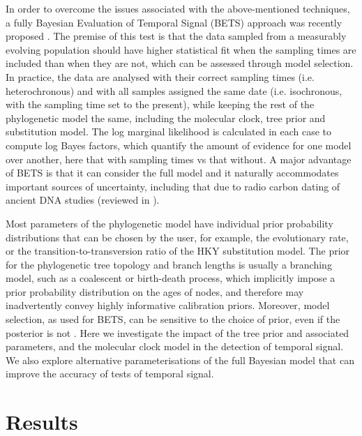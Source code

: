 \documentclass[10pt,letterpaper]{article}
\begin{document}
In order to overcome the issues associated with the above-mentioned techniques, a fully Bayesian Evaluation of Temporal Signal (BETS) approach was recently proposed \cite{duchene2020bayesian}. The premise of this test is that the data sampled from a measurably evolving population should have higher statistical fit when the sampling times are included than when they are not, which can be assessed through model selection. In practice, the data are analysed with their correct sampling times (i.e. heterochronous) and with all samples assigned the same date (i.e. isochronous, with the sampling time set to the present), while keeping the rest of the phylogenetic model the same, including the molecular clock, tree prior and substitution model. The log marginal likelihood is calculated in each case to compute log Bayes factors, which quantify the amount of evidence for one model over another, here that with sampling times vs that without. A major advantage of BETS is that it can consider the full model and it naturally accommodates important sources of uncertainty, including that due to radio carbon dating of ancient DNA studies \cite{molak2015empirical} (reviewed in \cite{spyrou2019ancient, duchene2020recovery}). 

Most parameters of the phylogenetic model have individual prior probability distributions that can be chosen by the user, for example, the evolutionary rate, or the transition-to-transversion ratio of the HKY substitution model. The prior for the phylogenetic tree topology and branch lengths is usually a branching model, such as a coalescent or birth-death process, which implicitly impose a prior probability distribution on the ages of nodes, and therefore may inadvertently convey highly informative calibration priors. Moreover, model selection, as used for BETS, can be sensitive to the choice of prior, even if the posterior is not \cite{gelman1995avoiding, gelman2014bayesian}. Here we investigate the impact of the tree prior and associated parameters, and the molecular clock model in the detection of temporal signal. We also explore alternative parameterisations of the full Bayesian model that can improve the accuracy of tests of temporal signal.

\section*{Results}
\end{document}
